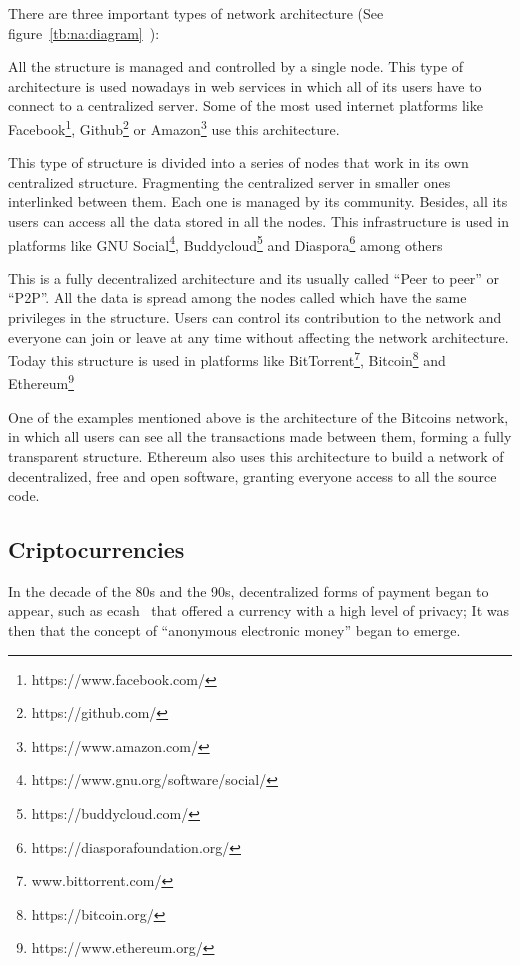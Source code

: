 There are three important types of network architecture (See
figure~\ref{tb:na:diagram}~\cite{baran1964distributed}):

\begin{itemize}
   All the structure is managed and controlled
  by a single node. This type of architecture is used nowadays in web services
  in which all of its users have to connect to a centralized server. Some of the
  most used internet platforms like
  Facebook\footnote{https://www.facebook.com/},
  Github\footnote{https://github.com/} or
  Amazon\footnote{https://www.amazon.com/} use this architecture.

  
   This type of structure is divided into a
  series of nodes that work in its own centralized structure. Fragmenting the
  centralized server in smaller ones interlinked between them. Each one is
  managed by its community. Besides, all its users can access all the data
  stored in all the nodes. This infrastructure is used in platforms like GNU
  Social\footnote{https://www.gnu.org/software/social/},
  Buddycloud\footnote{https://buddycloud.com/} and
  Diaspora\footnote{https://diasporafoundation.org/} among others

   This is a fully decentralized architecture
  and its usually called ``Peer to peer'' or ``P2P''.
  All the data is spread among the nodes called  which have the same
  privileges in the structure. Users can control its contribution to the network
  and everyone can join or leave at any time without affecting the network
  architecture. Today this structure is used in platforms like
  BitTorrent\footnote{www.bittorrent.com/},
  Bitcoin\footnote{https://bitcoin.org/} and
  Ethereum\footnote{https://www.ethereum.org/}
\end{itemize}


One of the examples mentioned above is the architecture of the Bitcoins network,
in which all users can see all the transactions made between them,
forming a fully transparent structure. Ethereum also uses this architecture to
build a network of decentralized, free and open software, granting everyone
access to all the source code.

\subsection{Criptocurrencies}
\label{tb:cryptos}
In the decade of the 80s and the 90s, decentralized forms of payment began to
appear, such as ecash~\cite{chaum1995introduction} that offered a currency with
a high level of privacy; It was then that the concept of ``anonymous electronic
money'' began to emerge.

